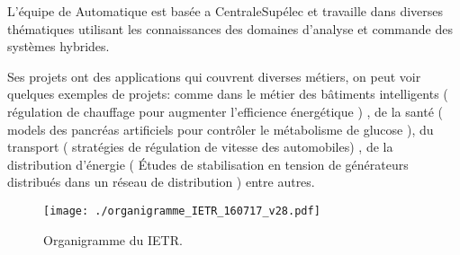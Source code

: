 L'équipe de Automatique est basée a CentraleSupélec et travaille dans diverses thématiques utilisant les connaissances des domaines d'analyse et commande des systèmes hybrides.

Ses projets ont des applications qui couvrent diverses métiers, on peut voir quelques exemples de projets: comme dans le métier des bâtiments intelligents ( régulation de chauffage pour augmenter l'efficience énergétique )  ,  de la santé ( models des pancréas artificiels pour contrôler le métabolisme de glucose ), du transport ( stratégies de régulation de vitesse des automobiles) , de la distribution d'énergie ( Études de stabilisation en tension de générateurs distribués dans un réseau de distribution ) entre autres.

\vspace{.5cm}
\begin{figure}[H]
	\begin{center}	
		\texttt{[image: ./organigramme\_IETR\_160717\_v28.pdf]}
		\caption{Organigramme du IETR.}
		\label{fig:organigramme_IETR_160717_v28}
	\end{center}
\end{figure}












